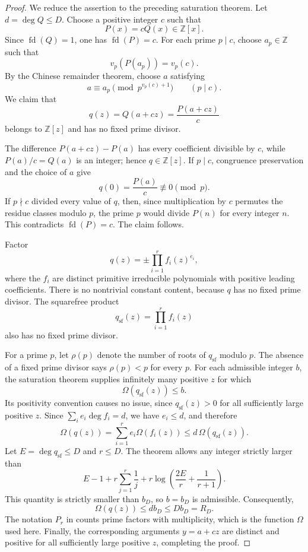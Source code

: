 \documentclass[11pt]{amsart}
\newcommand{\Z}{\mathbb Z}
\newcommand{\fd}{\operatorname{fd}}
\theoremstyle{definition}
\begin{document}
\begin{proof}
We reduce the assertion to the preceding saturation theorem.  Let
\(d=\deg Q\le D\).
Choose a positive integer \(c\) such that
\[
  P(x)=cQ(x)\in\Z[x].
\]
Since \(\fd(Q)=1\), one has \(\fd(P)=c\).  For each prime \(p\mid c\),
choose \(a_p\in\Z\) such that
\[
  v_p(P(a_p))=v_p(c).
\]
By the Chinese remainder theorem, choose \(a\) satisfying
\[
  a\equiv a_p\pmod {p^{v_p(c)+1}}\qquad(p\mid c).
\]
We claim that
\[
  q(z)=Q(a+cz)=\frac{P(a+cz)}{c}
\]
belongs to \(\Z[z]\) and has no fixed prime divisor.

The difference \(P(a+cz)-P(a)\) has every coefficient divisible by \(c\),
while \(P(a)/c=Q(a)\) is an integer; hence \(q\in\Z[z]\).
If \(p\mid c\), congruence preservation and the choice of \(a\) give
\[
  q(0)=\frac{P(a)}c\not\equiv0\pmod p.
\]
If \(p\nmid c\) divided every value of \(q\), then, since multiplication by
\(c\) permutes the residue classes modulo \(p\), the prime \(p\) would divide
\(P(n)\) for every integer \(n\).  This contradicts \(\fd(P)=c\).  The
claim follows.

Factor
\[
  q(z)=\pm\prod_{i=1}^r f_i(z)^{e_i},
\]
where the \(f_i\) are distinct primitive irreducible polynomials with
positive leading coefficients.  There is no nontrivial constant content,
because \(q\) has no fixed prime divisor.  The squarefree product
\[
  q_{\mathrm{sf}}(z)=\prod_{i=1}^r f_i(z)
\]
also has no fixed prime divisor.

For a prime \(p\), let \(\rho(p)\) denote the number of roots of
\(q_{\mathrm{sf}}\) modulo \(p\).  The absence of a fixed prime divisor says
\(\rho(p)<p\) for every \(p\).  For each admissible integer \(b\), the
saturation theorem supplies infinitely many positive \(z\) for which
\[
  \Omega(q_{\mathrm{sf}}(z))\le b.
\]
Its positivity convention causes no issue, since
\(q_{\mathrm{sf}}(z)>0\) for all sufficiently large positive \(z\).  Since
\(\sum_i e_i\deg f_i=d\), we have \(e_i\le d\), and
therefore
\[
  \Omega(q(z))
  =\sum_{i=1}^r e_i\Omega(f_i(z))
  \le d\,\Omega(q_{\mathrm{sf}}(z)).
\]
Let \(E=\deg q_{\mathrm{sf}}\le D\) and \(r\le D\).  The theorem allows any
integer strictly larger than
\[
  E-1+r\sum_{j=1}^r\frac1j+
  r\log\left(\frac{2E}{r}+\frac1{r+1}\right).
\]
This quantity is strictly smaller than \(b_D\), so \(b=b_D\) is admissible.
Consequently,
\[
  \Omega(q(z))\le d b_D\le D b_D=R_D.
\]
The notation \(P_r\) in
\cite[p. 242]{HalberstamRichert} counts prime factors with multiplicity,
which is the function \(\Omega\) used here.  Finally, the corresponding
arguments \(y=a+cz\) are distinct and positive for all sufficiently large
positive \(z\), completing the proof.
\end{proof}
\end{document}
